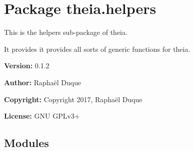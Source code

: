 %
%
%


\section{Package theia.helpers}

    \label{theia:helpers}
This is the helpers sub-package of theia.

It provides it provides all sorts of generic functions for theia.

\textbf{Version:} 0.1.2



\textbf{Author:} Raphaël Duque



\textbf{Copyright:} Copyright 2017, Raphaël Duque



\textbf{License:} GNU GPLv3+





\subsection{Modules}

